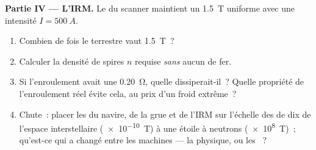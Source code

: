 \begin{problem}
\medskip
\noindent\textbf{Partie IV --- L'IRM.}
Le  du scanner maintient un
\qty{1.5}{T} uniforme avec une intensité $I = \qty{500}{A}$.
\begin{enumerate}[resume]
  \item Combien de fois le
         terrestre vaut
        \qty{1.5}{T}~?
  \item Calculer la densité de spires $n$ requise \emph{sans} aucun
         de fer.
  \item Si l'enroulement avait une
         \qty{0.20}{\ohm},
        quelle  dissiperait-il~?
        Quelle propriété de l'enroulement réel évite cela, au prix d'un
        froid extrême~?
  \item Chute~: placer les
         du navire, de la grue
        et de l'IRM sur l'échelle des  de dix de l'espace
        interstellaire (\qty{e-10}{T}) à une étoile à neutrons
        (\qty{e8}{T})~; qu'est-ce qui a changé entre les machines --- la
        physique, ou les
        ~?
\end{enumerate}
\end{problem}
